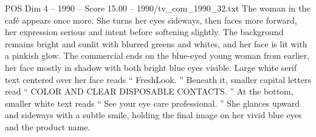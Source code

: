 \begin{textsample}{POS Dim 4 – 1990 – Score 15.00 – 1990/tv\_com\_1990\_32.txt}
The woman in the café appears once more.
She turns her eyes sideways, then faces more forward, her expression serious and intent before softening slightly.
The background remains bright and sunlit with blurred greens and whites, and her face is lit with a pinkish glow.
The commercial ends on the blue-eyed young woman from earlier, her face mostly in shadow with both bright blue eyes visible.
Large white serif text centered over her face reads “ FreshLook. ” Beneath it, smaller capital letters read “ COLOR AND CLEAR DISPOSABLE CONTACTS. ” At the bottom, smaller white text reads “ See your eye care professional. ” She glances upward and sideways with a subtle smile, holding the final image on her vivid blue eyes and the product name.

\end{textsample}
